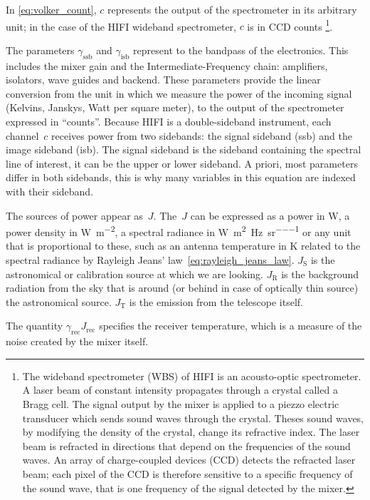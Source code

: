 In \cref{eq:volker_count}, $c$ represents the output of the spectrometer in its arbitrary unit; in the case of the HIFI wideband spectrometer, $c$ is in CCD counts%
\footnote{
    The wideband spectrometer (WBS) of HIFI is an acousto-optic spectrometer.
    A laser beam of constant intensity propagates through a crystal called
    a Bragg cell.
    The signal output by the mixer is applied to a piezzo electric transducer
    which sends sound waves through the crystal.
    Theses sound waves, by modifying the density of the crystal, change its
    refractive index.
    The laser beam is refracted in directions that depend on the frequencies of
    the sound waves.
    An array of charge-coupled devices (CCD) detects the refracted laser beam;
    each pixel of the CCD is therefore sensitive to a specific frequency
    of the sound wave, that is one frequency of the signal detected by the mixer.
}.

The parameters $\gamma_\text{ssb}$ and $\gamma_\text{isb}$ represent to the bandpass of the electronics.
This includes the mixer gain and the Intermediate-Frequency chain: amplifiers, isolators, wave guides and backend.
These parameters provide the linear conversion from the unit in which we measure the power of the incoming signal (Kelvins, Janskys, Watt per square meter), to the output of the spectrometer expressed in ``counts''.
Because HIFI is a double-sideband instrument, each channel~$c$ receives power from two sidebands: the signal sideband (ssb) and the image sideband (isb).
The signal sideband is the sideband containing the spectral line of interest, it can be the upper or lower sideband.
A priori, most parameters differ in both sidebands, this is why many variables in this equation are indexed with their sideband.

The sources of power appear as~$J$.
The~$J$ can be expressed as a power in \si{\watt}, a power density in \si{\watt\per\meter\squared}, a spectral radiance in \si{\watt\per\meter\squared\per\hertz\per\steradian} or any unit that is proportional to these, such as an antenna temperature in \si{\kelvin} related to the spectral radiance by Rayleigh Jeans' law~\eqref{eq:rayleigh_jeans_law}.
$J_\text{S}$ is the astronomical or calibration source at which we are looking.
$J_\text{R}$ is the background radiation from the sky that is around (or behind in case of optically thin source) the astronomical source.
$J_\text{T}$ is the emission from the telescope itself.

The quantity $\gamma_\text{rec} J_\text{rec}$ specifies the receiver temperature, which is a measure of the noise created by the mixer itself.

